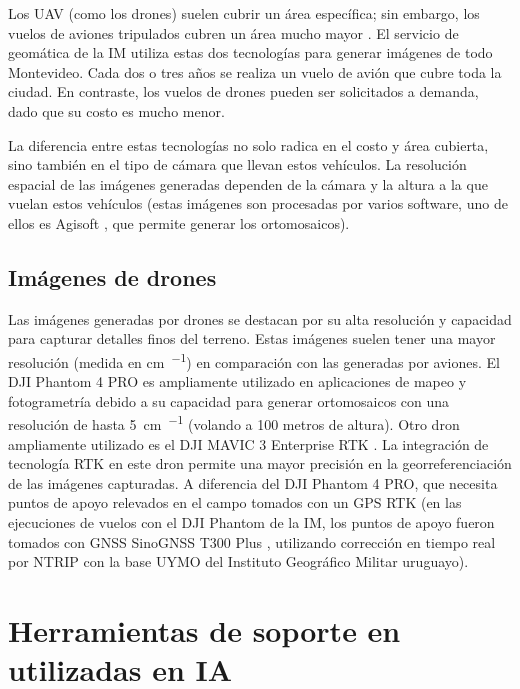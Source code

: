 Los UAV (como los drones) suelen cubrir un área específica; sin embargo, los vuelos de aviones tripulados cubren un área mucho mayor \citep{2000_aviation_ortoimagenes_nodate}. El servicio de geomática de la IM utiliza estas dos tecnologías para generar imágenes de todo Montevideo. Cada dos o tres años se realiza un vuelo de avión que cubre toda la ciudad. En contraste, los vuelos de drones pueden ser solicitados a demanda, dado que su costo es mucho menor.

La diferencia entre estas tecnologías no solo radica en el costo y área cubierta, sino también en el tipo de cámara que llevan estos vehículos. La resolución espacial de las imágenes generadas dependen de la cámara y la altura a la que vuelan estos vehículos (estas imágenes son procesadas por varios software, uno de ellos es Agisoft \citep{agisoft_agisoft_nodate}, que permite generar los ortomosaicos).

\subsection{Imágenes de drones}
\label{sec:imgUavDrones}

Las imágenes generadas por drones se destacan por su alta resolución y capacidad para capturar detalles finos del terreno. Estas imágenes suelen tener una mayor resolución (medida en \si{\centi\meter\per\pixel}) en comparación con las generadas por aviones. El DJI Phantom 4 PRO \citep{dji_support_nodate} es ampliamente utilizado en aplicaciones de mapeo y fotogrametría debido a su capacidad para generar ortomosaicos con una resolución de hasta \SI{5}{\centi\meter\per\pixel} (volando a 100 metros de altura). Otro dron ampliamente utilizado es el DJI MAVIC 3 Enterprise RTK \citep{dji_specs_nodate}. La integración de tecnología RTK \citep{wikipedia_rtk_2024} en este dron permite una mayor precisión en la georreferenciación de las imágenes capturadas. A diferencia del DJI Phantom 4 PRO, que necesita puntos de apoyo relevados en el campo tomados con un GPS RTK (en las ejecuciones de vuelos con el DJI Phantom de la IM, los puntos de apoyo fueron tomados con GNSS SinoGNSS T300 Plus \citep{comnav_technology_ltd_receptor_nodate}, utilizando corrección en tiempo real por NTRIP \citep{wikipedia_networked_2025} con la base UYMO del Instituto Geográfico Militar uruguayo).

\section{Herramientas de soporte en utilizadas en IA}
\label{sec:herramSopIA}

